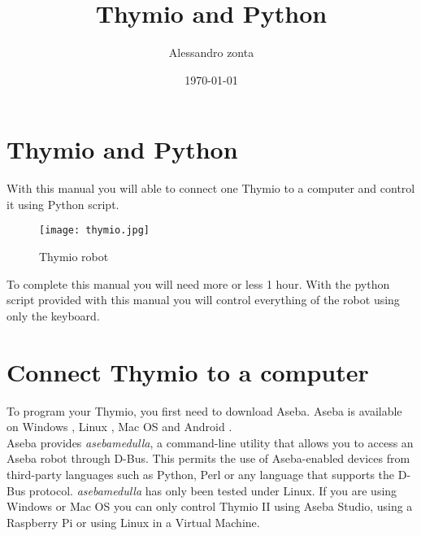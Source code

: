 \documentclass[12pt]{article}%
\begin{document}

\title{Thymio and Python}
\author{Alessandro zonta}
\date{\today}
\maketitle

\section{Thymio and Python}
	With this manual you will able to connect one Thymio to a computer and control it using Python script. 
	
	\begin{figure}[h]
		\centering
		\texttt{[image: thymio.jpg]}
		\caption{Thymio robot}
	\end{figure}
	
	To complete this manual you will need more or less 1 hour. With the python script provided with this manual you will control everything of the robot using only the keyboard.
	

\section{Connect Thymio to a computer}
	To program your Thymio, you first need to download Aseba.
	Aseba is available on Windows \cite{windows} , Linux \cite{linux} , Mac OS \cite{mac} and Android \cite{android}.\\
	
	Aseba provides \textit{asebamedulla}, a command-line utility that allows you to access an Aseba robot through D-Bus.
	This permits the use of Aseba-enabled devices from third-party languages such as Python, Perl or any language that supports the D-Bus protocol. 
	\textit{asebamedulla} has only been tested under Linux.
	If you are using Windows or Mac OS you can only control Thymio II using Aseba Studio, using a Raspberry Pi or using Linux in a Virtual Machine.\\
	
\end{document}
